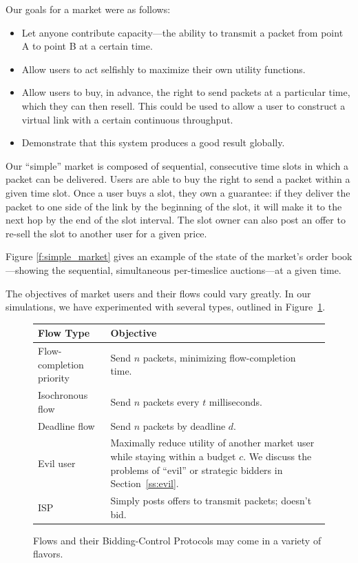 Our goals for a market were as follows:
\begin{itemize}
\item Let anyone contribute capacity---the ability to transmit a
packet from point A to point B at a certain time.

\item Allow users to act selfishly to maximize their own utility
functions.

\item Allow users to buy, in advance, the right to send packets at a
particular time, which they can then resell. This could be used to
allow a user to construct a virtual link with a certain continuous
throughput.

\item Demonstrate that this system produces a good result globally.
\end{itemize}

Our ``simple'' market is composed of sequential, consecutive time
slots in which a packet can be delivered. Users are able to buy the
right to send a packet within a given time slot.  Once a user buys a slot,
they own a guarantee: if they deliver the packet to one
side of the link by the beginning of the slot, it will make it to the
next hop by the end of the slot interval. The slot owner can also post an offer to re-sell
the slot to another user for a given price.

Figure \ref{f:simple_market} gives an example of the state of the
market's order book---showing the sequential, simultaneous per-timeslice
auctions---at a given time.

The objectives of market users and their flows could vary greatly. In our simulations,
we have experimented with several types, outlined in Figure~\ref{f:user_types}.
\begin{figure}
\small
\begin{tabular}{|p{}|p{}|}
\hline
Flow Type & Objective \\
\hline
\hline
Flow-completion priority & Send $n$ packets, minimizing flow-completion time. \\
\hline
Isochronous flow & Send $n$ packets every $t$ milliseconds. \\
\hline
Deadline flow & Send $n$ packets by deadline $d$. \\
\hline
Evil user & Maximally reduce utility of another market user while
staying within a budget $c$. We discuss the problems of ``evil'' or
strategic bidders in Section~\ref{ss:evil}. \\
\hline
ISP & Simply posts offers to transmit packets; doesn't bid. \\
\hline
\end{tabular}
\caption{Flows and their Bidding-Control Protocols may come in a variety of flavors.}
\label{f:user_types}
\end{figure}

